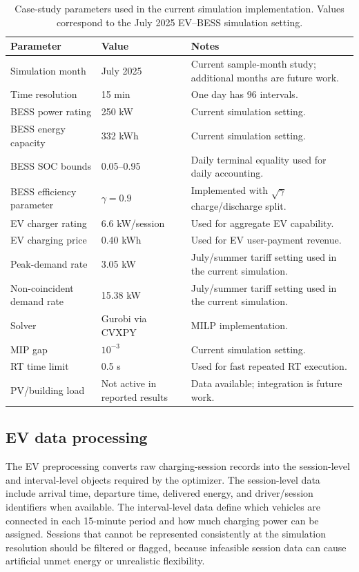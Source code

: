 \documentclass[final,5p,times]{elsarticle}
\begin{document}
\begin{table}[!t]
\centering
\caption{Case-study parameters used in the current simulation implementation. Values correspond to the July 2025 EV--BESS simulation setting.}
\label{tab:case_parameters}
\scriptsize
\begin{tabularx}{\textwidth}{@{}p{}p{}X@{}}
\toprule
Parameter & Value & Notes \\
\midrule
Simulation month & July 2025 & Current sample-month study; additional months are future work.\\
Time resolution & 15 min & One day has 96 intervals.\\
BESS power rating & 250 kW & Current simulation setting.\\
BESS energy capacity & 332 kWh & Current simulation setting.\\
BESS SOC bounds & 0.05--0.95 & Daily terminal equality used for daily accounting.\\
BESS efficiency parameter & $\gamma=0.9$ & Implemented with $\sqrt{\gamma}$ charge/discharge split.\\
EV charger rating & 6.6 kW/session & Used for aggregate EV capability.\\
EV charging price & 0.40 \/kWh & Used for EV user-payment revenue.\\
Peak-demand rate & 3.05 \/kW & July/summer tariff setting used in the current simulation.\\
Non-coincident demand rate & 15.38 \/kW & July/summer tariff setting used in the current simulation.\\
Solver & Gurobi via CVXPY & MILP implementation.\\
MIP gap & $10^{-3}$ & Current simulation setting.\\
RT time limit & 0.5 s & Used for fast repeated RT execution.\\
PV/building load & Not active in reported results & Data available; integration is future work.\\
\bottomrule
\end{tabularx}
\end{table}

\subsection{EV data processing}
The EV preprocessing converts raw charging-session records into the session-level and interval-level objects required by the optimizer. The session-level data include arrival time, departure time, delivered energy, and driver/session identifiers when available. The interval-level data define which vehicles are connected in each 15-minute period and how much charging power can be assigned. Sessions that cannot be represented consistently at the simulation resolution should be filtered or flagged, because infeasible session data can cause artificial unmet energy or unrealistic flexibility.
\end{document}
